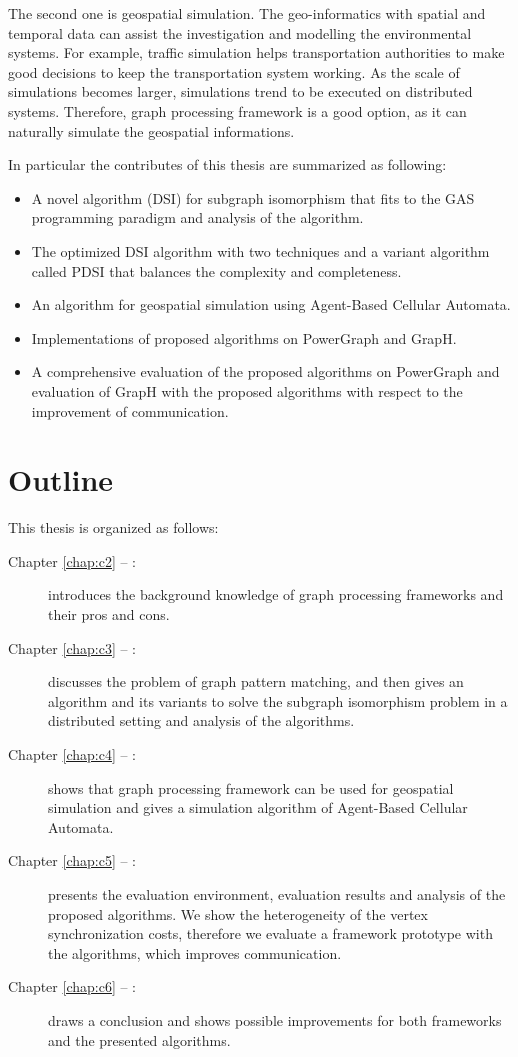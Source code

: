 The second one is geospatial simulation. The geo-informatics with spatial and temporal data can assist the investigation and modelling the environmental systems. For example, traffic simulation helps transportation authorities to make good decisions to keep the transportation system working. As the scale of simulations becomes larger, simulations trend to be executed on distributed systems. Therefore, graph processing framework is a good option, as it can naturally simulate the geospatial informations.

In particular the contributes of this thesis are summarized as following:

	\begin{itemize}
	\item A novel algorithm (DSI) for subgraph isomorphism that fits to the GAS programming paradigm and analysis of the algorithm.
	\item The optimized DSI algorithm with two techniques and a variant algorithm called PDSI that balances the complexity and completeness. 
	\item An algorithm for geospatial simulation using Agent-Based Cellular Automata.
	\item Implementations of proposed algorithms on PowerGraph and GrapH.
	\item A comprehensive evaluation of the proposed algorithms on PowerGraph and evaluation of GrapH with the proposed algorithms with respect to the improvement of communication.
	\end{itemize}


\section*{Outline}

This thesis is organized as follows:
\begin{description}
\item[Chapter \ref{chap:c2} -- :] introduces the background knowledge of graph processing frameworks and their pros and cons.
\item[Chapter \ref{chap:c3} -- :] discusses the problem of graph pattern matching, and then gives an algorithm and its variants to solve the subgraph isomorphism problem in a distributed setting and analysis of the algorithms. 
\item[Chapter \ref{chap:c4} -- :] shows that graph processing framework can be used for geospatial simulation and gives a simulation algorithm of Agent-Based Cellular Automata.
\item[Chapter \ref{chap:c5} -- :] presents the evaluation environment, evaluation results and analysis of the proposed algorithms. We show the heterogeneity of the vertex synchronization costs, therefore we evaluate a framework prototype with the algorithms, which improves communication.
\item[Chapter \ref{chap:c6} -- :] draws a conclusion and shows possible improvements for both frameworks and the presented algorithms.

\end{description}